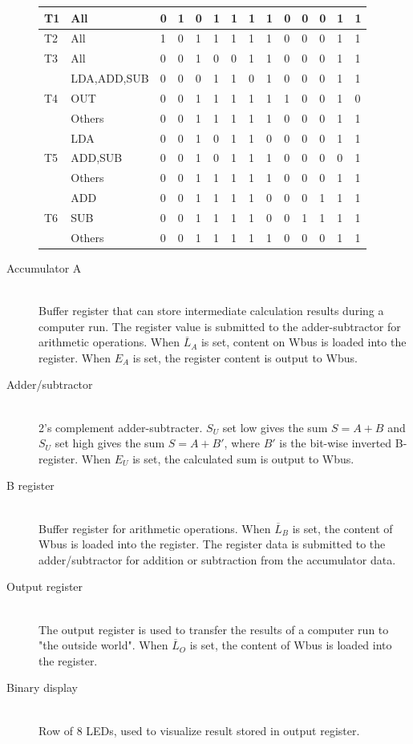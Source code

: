\begin{description}
\begin{table}[hbpt]
\begin{tabular}{p{0.8cm}lp{0.3cm}p{0.3cm}p{0.3cm}p{0.3cm}p{0.3cm}p{0.3cm}p{0.3cm}p{0.3cm}p{0.3cm}p{0.3cm}p{0.3cm}p{0.3cm}}
    \toprule
    T1 &All&	        0&	1&	0&	1&	1&	1&	1&	0&	0&	0&	1&	1\\
    \hline
    T2 &All&	        1&	0&	1&	1&	1&	1&	1&	0&	0&	0&	1&	1\\
    \hline
    T3 &All&	        0&	0&	1&	0&	0&	1&	1&	0&	0&	0&	1&	1\\
    \hline
    \multirow{3}{*}{T4}& LDA,ADD,SUB &  0&	0&	0&	1&	1&	0&	1&	0&	0&	0&	1&	1\\
    \cline{2-14}
    & OUT&	        0&	0&	1&	1&	1&	1&	1&	1&	0&	0&	1&	0\\
    \cline{2-14}
    & Others&	    0&	0&	1&	1&	1&	1&	1&	0&	0&	0&	1&	1\\
    \hline
    \multirow{3}{*}{T5} &LDA&	        0&	0&	1&	0&	1&	1&	0&	0&	0&	0&	1&	1\\
    \cline{2-14}
    &ADD,SUB&	    0&	0&	1&	0&	1&	1&	1&	0&	0&	0&	0&	1\\
    \cline{2-14}
    &Others&	    0&	0&	1&	1&	1&	1&	1&	0&	0&	0&	1&	1\\
    \hline
    \multirow{3}{*}{T6} &ADD&	        0&	0&	1&	1&	1&	1&	0&	0&	0&	1&	1&	1\\
    \cline{2-14}
    &SUB&	        0&	0&	1&	1&	1&	1&	0&	0&	1&	1&	1&	1\\
    \cline{2-14}
    &Others&	    0&	0&	1&	1&	1&	1&	1&	0&	0&	0&	1&	1\\
    \bottomrule
    \end{tabular}
\end{table}
    \item[Accumulator A] \hfill \\
    Buffer register that can store intermediate calculation results during a computer run. The register value is submitted to the adder-subtractor for arithmetic operations. When $\overline{L}_A$ is set, content on Wbus is loaded into the register. When $E_A$ is set, the register content is output to Wbus. 
    \item[Adder/subtractor] \hfill \\
    2's complement adder-subtracter. $S_U$ set low gives the sum $S=A+B$ and $S_U$ set high gives the sum $S=A+B'$, where $B'$ is the bit-wise inverted B-register. When $E_U$ is set, the calculated sum is output to Wbus.
    \item[B register] \hfill \\
    Buffer register for arithmetic operations. When $\overline{L}_B$ is set, the content of Wbus is loaded into the register. The register data is submitted to the adder/subtractor for addition or subtraction from the accumulator data.
    \item[Output register] \hfill \\
    The output register is used to transfer the results of a computer run to "the outside world". When $\overline{L}_O$ is set, the content of Wbus is loaded into the register. 
    \item[Binary display] \hfill \\
    Row of 8 LEDs, used to visualize result stored in output register.
\end{description}
